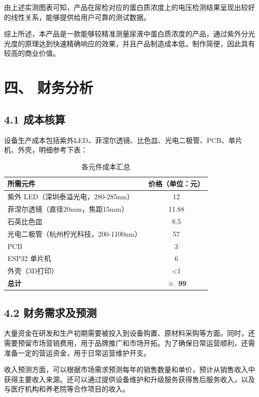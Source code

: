 \documentclass[a4paper,12pt]{article}
\begin{document}
由上述实测图表可知，产品在尿检对应的蛋白质浓度上的电压检测结果呈现出较好的线性关系，能够提供给用户可靠的测试数据。

综上所述，本产品是一款能够较精准测量尿液中蛋白质浓度的产品，通过紫外分光光度的原理达到快速精确响应的效果，并且产品制造成本低，制作简便，因此具有较高的商业价值。

\section*{四、 财务分析}
\subsection*{4.1 成本核算}
设备生产成本包括紫外LED、菲涅尔透镜、比色皿、光电二极管、PCB、单片机、外壳，明细参考下表：

\begin{table}[H]
    \centering
    \caption{各元件成本汇总}
    \renewcommand{\arraystretch}{1.2}
    \begin{tabular}{|p{8cm}|c|}
    \hline
    \textbf{所需元件} & \textbf{价格（单位：元）} \\
    \hline
    紫外 LED（深圳泰溢光电，280-285nm） & 12 \\
    \hline
    菲涅尔透镜（直径20mm，焦距15mm） & 11.88 \\
    \hline
    石英比色皿 & 8.5 \\
    \hline
    光电二极管（杭州柠光科技，200-1100nm） & 57 \\
    \hline
    PCB & 3 \\
    \hline
    ESP32 单片机 & 6 \\
    \hline
    外壳（3D打印） & <1 \\
    \hline
    \textbf{总计} & \textbf{$\approx$ 99} \\
    \hline
    \end{tabular}
\end{table}

\subsection*{4.2 财务需求及预测}
大量资金在研发和生产初期需要被投入到设备购置、原材料采购等方面。同时，还需要预留市场营销费用，用于品牌推广和市场开拓。为了确保日常运营顺利，还需准备一定的营运资金，用于日常运营维护开支。

收入预测方面，可以根据市场需求预测每年的销售数量和单价，预计从销售收入中获得主要收入来源。还可以通过提供设备维护和升级服务获得售后服务收入，以及与医疗机构和养老院等合作项目的收入。
\end{document}
